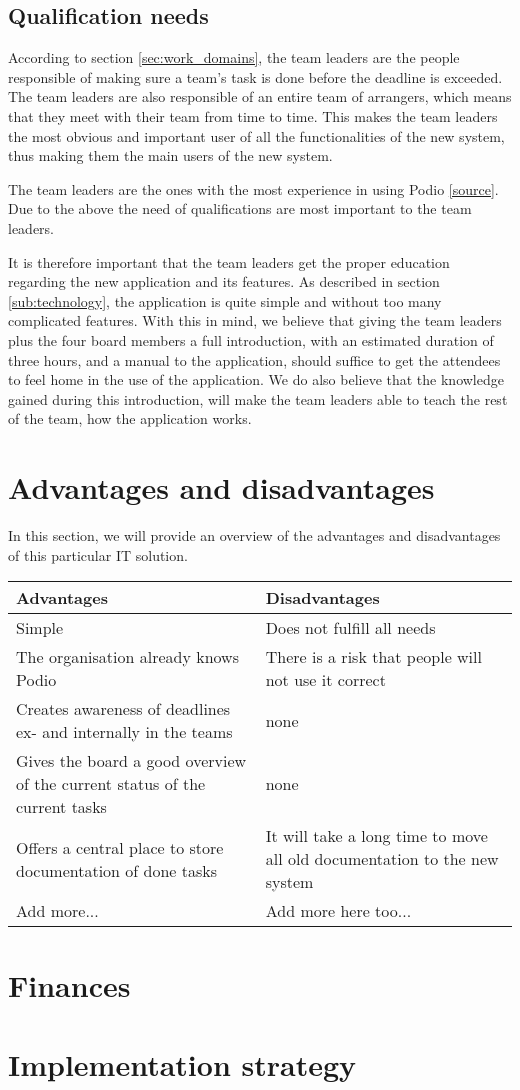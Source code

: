 \subsection{Qualification needs}
\label{sub:qualification_needs}
According to section \ref{sec:work_domains}, the team leaders are the people responsible of making
sure a team's task is done before the deadline is exceeded. The team leaders are also responsible
of an entire team of arrangers, which means that they meet with their team from time to time. This
makes the team leaders the most obvious and important user of all the functionalities of the new
system, thus making them the main users of the new system. 

The team leaders are the ones with the most experience in using Podio \ref{source}. Due to the above
the need of qualifications are most important to the team leaders. 

It is therefore important that the team leaders get the proper education regarding the new
application and its features. As described in section \ref{sub:technology}, the application is quite
simple and without too many complicated features. With this in mind, we believe that giving the team
leaders plus the four board members a full introduction, with an estimated duration of three hours,
and a manual to the application, should suffice to get the attendees to feel home in the use of the
application. We do also believe that the knowledge gained during this introduction, will make the
team leaders able to teach the rest of the team, how the application works.

\section{Advantages and disadvantages}
\label{sec:advantages_disadvantages}
In this section, we will provide an overview of the advantages and disadvantages of this particular
IT solution.


\begin{center}
    \begin{tabular}{ | p{7cm} | p{7cm} |}
    \hline
    \textbf{Advantages} & \textbf{Disadvantages}  \\ \hline
    Simple & Does not fulfill all needs  \\ \hline
    The organisation already knows Podio & There is a risk that people will not use it correct \\
    \hline
    Creates awareness of deadlines ex- and internally in the teams & none \\ \hline
    Gives the board a good overview of the current status of the current tasks & none \\ \hline
    Offers a central place to store documentation of done tasks & It will take a long time to move
    all old documentation to the new system \\ \hline
    Add more... & Add more here too... \\ 
    \hline
    \end{tabular}
\end{center}


\section{Finances}

\section{Implementation strategy}


